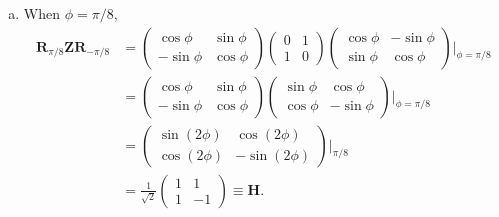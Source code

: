 \documentclass{book}
\theoremstyle{definition}
\newcommand{\nn}{\nonumber}
\newcommand{\f}[2]{\frac{#1}{#2}}
\newcommand{\Z}{\mathbf{Z}}
\newcommand{\had}{\mathbf{H}}
\begin{document}
\begin{enumerate}[(a)]
	
	\item When $\phi = \pi/8$,
	\begin{align}
	\mathbf{R}_{\pi/8}\Z \mathbf{R}_{-\pi/8} &= \begin{pmatrix}
	\cos\phi & \sin\phi \\ -\sin\phi & \cos\phi
	\end{pmatrix}\begin{pmatrix}
	0&1\\1&0
	\end{pmatrix}\begin{pmatrix}
	\cos\phi & -\sin\phi \\ \sin\phi & \cos\phi
	\end{pmatrix}\bigg\vert_{\phi = \pi/8}\nn\\
	&= \begin{pmatrix}
	\cos\phi & \sin\phi \\ -\sin\phi & \cos\phi
	\end{pmatrix}\begin{pmatrix}
	\sin\phi & \cos\phi \\ \cos\phi & -\sin\phi
	\end{pmatrix}\bigg\vert_{\phi = \pi/8}\nn\\
	&= \begin{pmatrix}
	\sin(2\phi) &  \cos(2\phi)  \\ \cos(2\phi) & -\sin(2\phi)
	\end{pmatrix}\bigg\vert_{\pi/8}\nn\\
	&= \f{1}{\sqrt{2}}\begin{pmatrix}
	1 & 1 \\ 1 & -1
	\end{pmatrix} \equiv \had.
	\end{align}
\end{enumerate}
\end{document}
